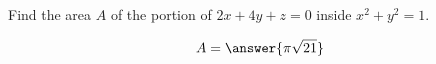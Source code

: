 \documentclass{ximera}
\author{David Guichard \and Neal Koblitz \and H. Jerome Keisler \and Albert Scheller \and Barry Balof \and Mike Wills \and Matthew Carr}
\begin{document}
\begin{exercise}




Find the area $A$ of the portion of $2x+4y+z=0$ inside $x^2+y^2=1$.
 
\begin{prompt}
\[
A=\answer{\pi\sqrt{21}}
\]
\end{prompt}


\end{exercise}
\end{document}
